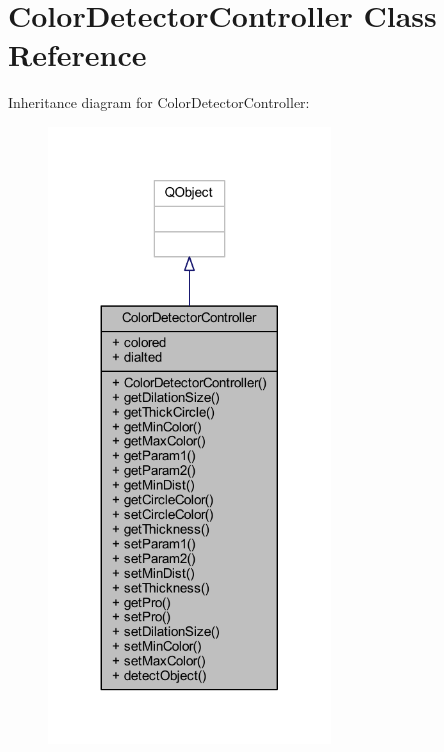 \hypertarget{class_color_detector_controller}{}\section{Color\+Detector\+Controller Class Reference}
\label{class_color_detector_controller}


Inheritance diagram for Color\+Detector\+Controller\+:\nopagebreak
\begin{figure}[H]
\begin{center}
\leavevmode
\includegraphics[width=212pt]{d8/d04/class_color_detector_controller__inherit__graph}
\end{center}
\end{figure}


